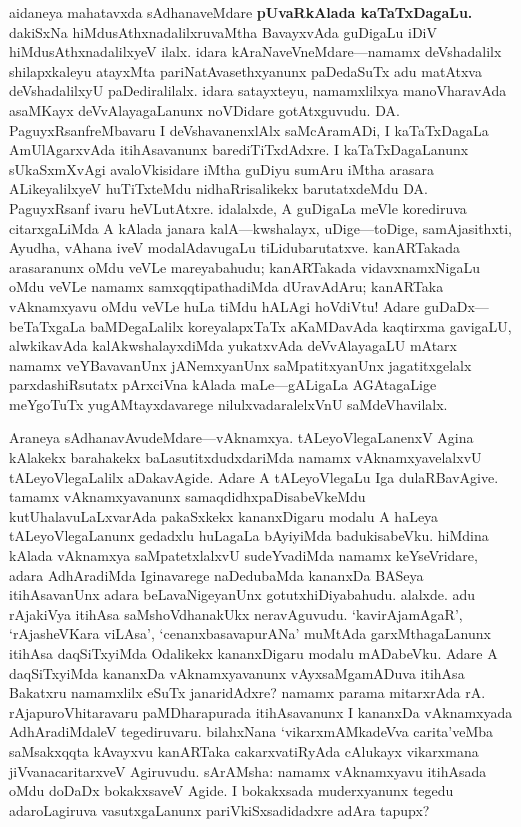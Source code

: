 \documentclass[11pt,a4size]{article}
\begin{document}
aidaneya mahatavxda sAdhanaveMdare \textbf{pUvaRkAlada kaTaTxDagaLu.}
dakiSxNa hiMdusAthxnadalilxruvaMtha BavayxvAda guDigaLu iDiV
hiMdusAthxnadalilxyeV ilalx. idara kAraNaveVneMdare---namamx
deVshadalilx shilapxkaleyu atayxMta pariNatAvasethxyanunx paDedaSuTx
adu matAtxva deVshadalilxyU paDediralilalx. idara satayxteyu,
namamxlilxya manoVharavAda asaMKayx deVvAlayagaLanunx noVDidare
gotAtxguvudu. DA. PaguyxRsanfreMbavaru I deVshavanenxlAlx saMcAramADi,
I kaTaTxDagaLa AmUlAgarxvAda itihAsavanunx barediTiTxdAdxre. I
kaTaTxDagaLanunx sUkaSxmXvAgi avaloVkisidare iMtha guDiyu sumAru iMtha
arasara ALikeyalilxyeV huTiTxteMdu nidhaRrisalikekx barutatxdeMdu
DA. PaguyxRsanf ivaru heVLutAtxre. idalalxde, A guDigaLa meVle
korediruva citarxgaLiMda A kAlada janara kalA---kwshalayx,
uDige---toDige, samAjasithxti, Ayudha, vAhana iveV modalAdavugaLu
tiLidubarutatxve. kanARTakada arasaranunx oMdu veVLe mareyabahudu;
kanARTakada vidavxnamxNigaLu oMdu veVLe namamx samxqqtipathadiMda
dUravAdAru; kanARTaka vAknamxyavu oMdu veVLe huLa tiMdu hALAgi
hoVdiVtu! Adare guDaDx---beTaTxgaLa baMDegaLalilx koreyalapxTaTx
aKaMDavAda kaqtirxma gavigaLU, alwkikavAda kalAkwshalayxdiMda
yukatxvAda deVvAlayagaLU mAtarx namamx veYBavavanUnx jANemxyanUnx
saMpatitxyanUnx jagatitxgelalx parxdashiRsutatx pArxciVna kAlada
maLe---gALigaLa AGAtagaLige meYgoTuTx yugAMtayxdavarege
nilulxvadaralelxVnU saMdeVhavilalx.

Araneya sAdhanavAvudeMdare---vAknamxya. tALeyoVlegaLanenxV Agina
kAlakekx barahakekx baLasutitxdudxdariMda namamx vAknamxyavelalxvU
tALeyoVlegaLalilx aDakavAgide. Adare A tALeyoVlegaLu Iga
dulaRBavAgive. tamamx vAknamxyavanunx samaqdidhxpaDisabeVkeMdu
kutUhalavuLaLxvarAda pakaSxkekx kananxDigaru modalu A haLeya
tALeyoVlegaLanunx gedadxlu huLagaLa bAyiyiMda badukisabeVku. hiMdina
kAlada vAknamxya saMpatetxlalxvU sudeYvadiMda namamx keYseVridare,
adara AdhAradiMda Iginavarege naDedubaMda kananxDa BASeya
itihAsavanUnx adara beLavaNigeyanUnx gotutxhiDiyabahudu. alalxde. adu
rAjakiVya itihAsa saMshoVdhanakUkx neravAguvudu. `kavirAjamAgaR',
`rAjasheVKara viLAsa', `cenanxbasavapurANa' muMtAda garxMthagaLanunx
itihAsa daqSiTxyiMda Odalikekx kananxDigaru modalu mADabeVku. Adare A
daqSiTxyiMda kananxDa vAknamxyavanunx vAyxsaMgamADuva itihAsa Bakatxru
namamxlilx eSuTx janaridAdxre? namamx parama mitarxrAda
rA. rAjapuroVhitaravaru paMDharapurada itihAsavanunx I kananxDa
vAknamxyada AdhAradiMdaleV tegediruvaru. bilahxNana `vikarxmAMkadeVva
carita'veMba saMsakxqqta kAvayxvu kanARTaka cakarxvatiRyAda cAlukayx
vikarxmana jiVvanacaritarxveV Agiruvudu. sArAMsha: namamx vAknamxyavu
itihAsada oMdu doDaDx bokakxsaveV Agide. I bokakxsada muderxyanunx
tegedu adaroLagiruva vasutxgaLanunx pariVkiSxsadidadxre adAra tapupx?
\end{document}
